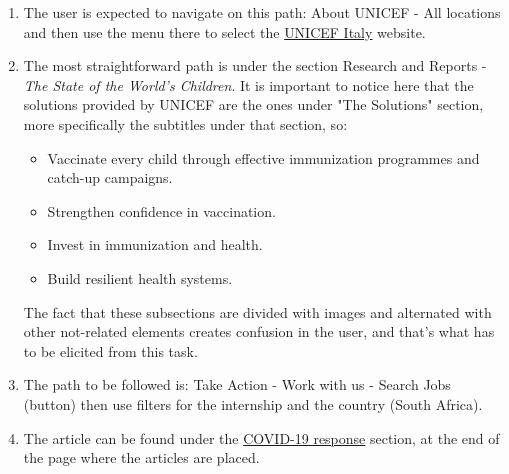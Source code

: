 \documentclass[11pt]{article}
\begin{document}
\begin{enumerate}
		\item The user is expected to navigate on this path: About UNICEF - All locations and then use the menu there to select the \href{https://www.unicef.it/}{UNICEF Italy} website.
		\item The most straightforward path is under the section Research and Reports - \textit{The State of the World's Children}. It is important to notice here that the solutions provided by UNICEF are the ones under "The Solutions" section, more specifically the subtitles under that section, so:
		\begin{itemize}
			\item Vaccinate every child through effective immunization programmes and catch-up campaigns.
			\item Strengthen confidence in vaccination.
			\item Invest in immunization and health.  
			\item Build resilient health systems. 
		\end{itemize}
		The fact that these subsections are divided with images and alternated with other not-related elements creates confusion in the user, and that's what has to be elicited from this task.
		\item The path to be followed is: Take Action - Work with us - Search Jobs (button) then use filters for the internship and the country (South Africa).
		\item The article can be found under the \href{https://www.unicef.org/coronavirus/covid-19}{COVID-19 response} section, at the end of the page where the articles are placed.
	\end{enumerate}
	
	
	
\end{document}
